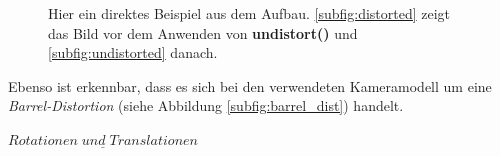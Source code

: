 		\begin{figure}[h]
			\centering
			\caption[Beispiel für die Verzerrung in Bildern]{Hier ein direktes Beispiel aus dem Aufbau. \ref{subfig:distorted} zeigt das Bild vor dem Anwenden von \textbf{undistort()} und \ref{subfig:undistorted} danach.}
			\label{fig:distortion_bsp}
		\end{figure}
	
		Ebenso ist erkennbar, dass es sich bei den verwendeten Kameramodell um eine \textit{Barrel-Distortion} (siehe Abbildung \ref{subfig:barrel_dist}) handelt.
		
		$\underline{Rotationen \; und \; Translationen}$
		
